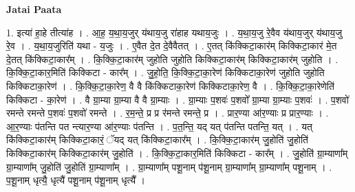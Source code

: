 \documentclass[17pt]{extarticle}
\begin{document}
\textbf{Jatai Paata} \newline

1. इत्या॑ हा॒हे तीत्या॑ह । . आ॒ह॒ य॒था॒य॒जुर् य॑थाय॒जु रा॑हाह यथाय॒जुः । . य॒था॒य॒जु रे॒वैव य॑थाय॒जुर् य॑थाय॒जु रे॒व । . य॒था॒य॒जुरिति॑ यथा - य॒जुः । . ए॒वैत दे॒त दे॒वैवैतत् । . ए॒तत् कि॑क्किटा॒कार॑म् किक्किटा॒कार॑ मे॒त दे॒तत् कि॑क्किटा॒कार᳚म् । . कि॒क्कि॒टा॒कार॑म् जुहोति जुहोति किक्किटा॒कार॑म् किक्किटा॒कार॑म् जुहोति । . कि॒क्कि॒टा॒कार॒मिति॑ किक्किटा - कार᳚म् । . जु॒हो॒ति॒ कि॒क्कि॒टा॒का॒रेण॑ किक्किटाका॒रेण॑ जुहोति जुहोति किक्किटाका॒रेण॑ । . कि॒क्कि॒टा॒का॒रेण॒ वै वै कि॑क्किटाका॒रेण॑ किक्किटाका॒रेण॒ वै । . कि॒क्कि॒टा॒का॒रेणेति॑ किक्किटा - का॒रेण॑ । . वै ग्रा॒म्या ग्रा॒म्या वै वै ग्रा॒म्याः । . ग्रा॒म्याः प॒शवः॑ प॒शवो᳚ ग्रा॒म्या ग्रा॒म्याः प॒शवः॑ । . प॒शवो॑ रमन्ते रमन्ते प॒शवः॑ प॒शवो॑ रमन्ते । . र॒म॒न्ते॒ प्र प्र र॑मन्ते रमन्ते॒ प्र । . प्रार॒ण्या आ॑र॒ण्याः प्र प्रार॒ण्याः । . आ॒र॒ण्याः प॑तन्ति पत न्त्यार॒ण्या आ॑र॒ण्याः प॑तन्ति । . प॒त॒न्ति॒ यद् यत् प॑तन्ति पतन्ति॒ यत् । . यत् कि॑क्किटा॒कार॑म् किक्किटा॒कारं॒ ॅयद् यत् कि॑क्किटा॒कार᳚म् । . कि॒क्कि॒टा॒कार॑म् जु॒होति॑ जु॒होति॑ किक्किटा॒कार॑म् किक्किटा॒कार॑म् जु॒होति॑ । . कि॒क्कि॒टा॒कार॒मिति॑ किक्किटा - कार᳚म् । . जु॒होति॑ ग्रा॒म्याणा᳚म् ग्रा॒म्याणा᳚म् जु॒होति॑ जु॒होति॑ ग्रा॒म्याणा᳚म् । . ग्रा॒म्याणा᳚म् पशू॒नाम् प॑शू॒नाम् ग्रा॒म्याणा᳚म् ग्रा॒म्याणा᳚म् पशू॒नाम् । . प॒शू॒नाम् धृत्यै॒ धृत्यै॑ पशू॒नाम् प॑शू॒नाम् धृत्यै᳚ । \newline
\end{document}
